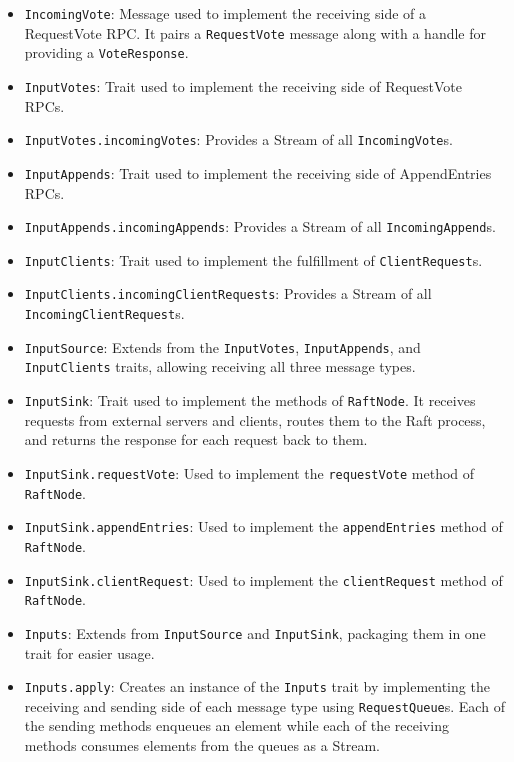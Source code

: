 \begin{itemize}
    \item \lstinline|IncomingVote|: Message used to implement the receiving side of a RequestVote RPC. It pairs a \lstinline|RequestVote| message along with a handle for providing a \lstinline|VoteResponse|.
    \item \lstinline|InputVotes|: Trait used to implement the receiving side of RequestVote RPCs.
    \item \lstinline|InputVotes.incomingVotes|: Provides a Stream of all \lstinline|IncomingVote|s.
    \item \lstinline|InputAppends|: Trait used to implement the receiving side of AppendEntries RPCs.
    \item \lstinline|InputAppends.incomingAppends|: Provides a Stream of all \lstinline|IncomingAppend|s.
    \item \lstinline|InputClients|: Trait used to implement the fulfillment of \lstinline|ClientRequest|s.
    \item \lstinline|InputClients.incomingClientRequests|: Provides a Stream of all \lstinline|IncomingClientRequest|s.
    \item \lstinline|InputSource|: Extends from the \lstinline|InputVotes|, \lstinline|InputAppends|, and \lstinline|InputClients| traits, allowing receiving all three message types.
    \item \lstinline|InputSink|: Trait used to implement the methods of \lstinline|RaftNode|. It receives requests from external servers and clients, routes them to the Raft process, and returns the response for each request back to them.
    \item \lstinline|InputSink.requestVote|: Used to implement the \lstinline|requestVote| method of \lstinline|RaftNode|.
    \item \lstinline|InputSink.appendEntries|: Used to implement the \lstinline|appendEntries| method of \lstinline|RaftNode|.
    \item \lstinline|InputSink.clientRequest|: Used to implement the \lstinline|clientRequest| method of \lstinline|RaftNode|.
    \item \lstinline|Inputs|: Extends from \lstinline|InputSource| and \lstinline|InputSink|, packaging them in one trait for easier usage.
    \item \lstinline|Inputs.apply|: Creates an instance of the \lstinline|Inputs| trait by implementing the receiving and sending side of each message type using 
    \lstinline|RequestQueue|s. Each of the sending methods enqueues an element while each of the receiving methods consumes elements from the queues as a Stream.

\end{itemize}
